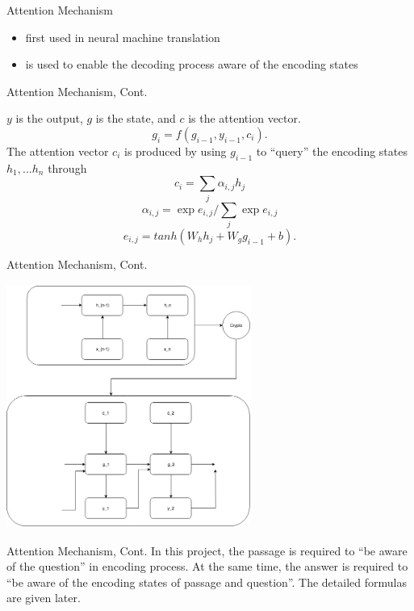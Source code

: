 \documentclass{beamer}
\begin{document}
\begin{frame}{Attention Mechanism}
    \begin{itemize}
        \item first used in neural machine translation
        \item is used to enable the decoding process aware of the encoding states
    \end{itemize}
\end{frame}

\begin{frame}{Attention Mechanism, Cont.}
    \begin{examples}
        $y$ is the output, $g$ is the state, and $c$ is the attention vector. $$g_i =f(g_{i-1},y_{i-1},c_i).$$
        The attention vector $c_i$ is produced by using $g_{i-1}$ to ``query'' the encoding states $h_1, ... h_n$ through
        $$c_i = \sum _j {\alpha _{i,j} h_j}$$
        $$\alpha _{i,j} = \exp{e_{i,j}} / \sum _j {\exp{e_{i,j}}}$$
        $$e_{i,j} = tanh(W_h h_j + W_g g_{i-1} + b).$$
    \end{examples}

\end{frame}

\begin{frame}{Attention Mechanism, Cont.}
    \begin{center}
        \includegraphics[width=8cm, height=8cm]{figures/attention}
    \end{center}
\end{frame}

\begin{frame}{Attention Mechanism, Cont.}
    In this project, the passage is required to ``be aware of the question'' in encoding process. At the same time, the answer is required to ``be aware of the encoding states of passage and question''. The detailed formulas are given later.
\end{frame}
\end{document}
